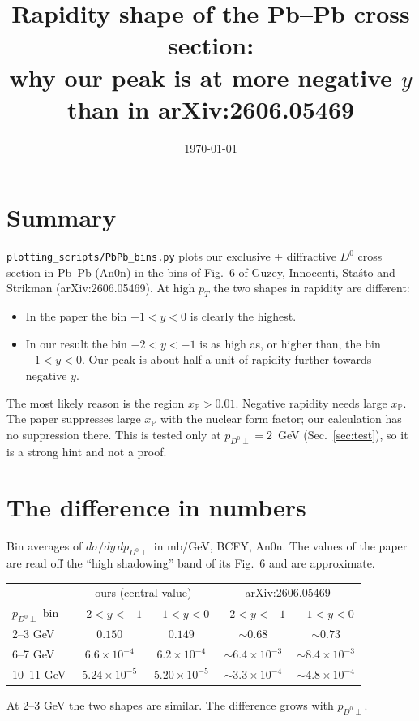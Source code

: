 \documentclass[11pt]{article}
\title{Rapidity shape of the Pb--Pb cross section:\\
why our peak is at more negative $y$ than in arXiv:2606.05469}
\author{}
\date{\today}
\begin{document}
\maketitle

\section{Summary}

\texttt{plotting\_scripts/PbPb\_bins.py} plots our exclusive + diffractive
$D^0$ cross section in Pb--Pb (An0n) in the bins of Fig.~6 of Guzey,
Innocenti, Sta\'sto and Strikman (arXiv:2606.05469). At high $p_T$ the two
shapes in rapidity are different:
\begin{itemize}
  \item In the paper the bin $-1<y<0$ is clearly the highest.
  \item In our result the bin $-2<y<-1$ is as high as, or higher than, the bin
    $-1<y<0$. Our peak is about half a unit of rapidity further towards
    negative $y$.
\end{itemize}
The most likely reason is the region $x_\mathbb{P}>0.01$. Negative rapidity
needs large $x_\mathbb{P}$. The paper suppresses large $x_\mathbb{P}$ with the
nuclear form factor; our calculation has no suppression there. This is tested
only at $p_{D^0\perp}=2$~GeV (Sec.~\ref{sec:test}), so it is a strong hint and
not a proof.

\section{The difference in numbers}

Bin averages of $d\sigma/dy\,dp_{D^0\perp}$ in mb/GeV, BCFY, An0n. The values
of the paper are read off the ``high shadowing'' band of its Fig.~6 and are
approximate.
\begin{center}
\begin{tabular}{lcccc}
\toprule
 & \multicolumn{2}{c}{ours (central value)} & \multicolumn{2}{c}{arXiv:2606.05469} \\
$p_{D^0\perp}$ bin & $-2<y<-1$ & $-1<y<0$ & $-2<y<-1$ & $-1<y<0$ \\
\midrule
2--3 GeV   & $0.150$ & $0.149$ & $\sim0.68$ & $\sim0.73$ \\
6--7 GeV   & $6.6\times10^{-4}$ & $6.2\times10^{-4}$ & $\sim6.4\times10^{-3}$ & $\sim8.4\times10^{-3}$ \\
10--11 GeV & $5.24\times10^{-5}$ & $5.20\times10^{-5}$ & $\sim3.3\times10^{-4}$ & $\sim4.8\times10^{-4}$ \\
\bottomrule
\end{tabular}
\end{center}
At 2--3 GeV the two shapes are similar. The difference grows with
$p_{D^0\perp}$.
\end{document}
